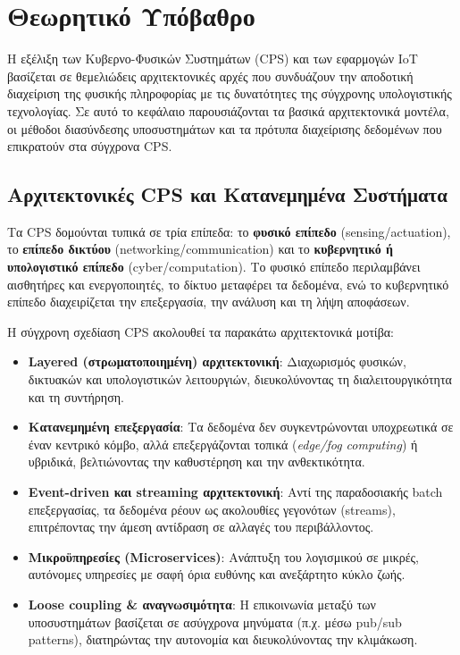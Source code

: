 \chapter{Θεωρητικό Υπόβαθρο}

Η εξέλιξη των Κυβερνο-Φυσικών Συστημάτων (CPS) και των εφαρμογών IoT βασίζεται σε θεμελιώδεις αρχιτεκτονικές αρχές που συνδυάζουν την αποδοτική διαχείριση της φυσικής πληροφορίας με τις δυνατότητες της σύγχρονης υπολογιστικής τεχνολογίας. Σε αυτό το κεφάλαιο παρουσιάζονται τα βασικά αρχιτεκτονικά μοντέλα, οι μέθοδοι διασύνδεσης υποσυστημάτων και τα πρότυπα διαχείρισης δεδομένων που επικρατούν στα σύγχρονα CPS.

\section{Αρχιτεκτονικές CPS και Κατανεμημένα Συστήματα}

Τα CPS δομούνται τυπικά σε τρία επίπεδα: το \textbf{φυσικό επίπεδο} (sensing/actuation), το \textbf{επίπεδο δικτύου} (networking/communication) και το \textbf{κυβερνητικό ή υπολογιστικό επίπεδο} (cyber/computation). Το φυσικό επίπεδο περιλαμβάνει αισθητήρες και ενεργοποιητές, το δίκτυο μεταφέρει τα δεδομένα, ενώ το κυβερνητικό επίπεδο διαχειρίζεται την επεξεργασία, την ανάλυση και τη λήψη αποφάσεων.

Η σύγχρονη σχεδίαση CPS ακολουθεί τα παρακάτω αρχιτεκτονικά μοτίβα:

\begin{itemize}
	\item \textbf{Layered (στρωματοποιημένη) αρχιτεκτονική}: Διαχωρισμός φυσικών, δικτυακών και υπολογιστικών λειτουργιών, διευκολύνοντας τη διαλειτουργικότητα και τη συντήρηση.
	\item \textbf{Κατανεμημένη επεξεργασία}: Τα δεδομένα δεν συγκεντρώνονται υποχρεωτικά σε έναν κεντρικό κόμβο, αλλά επεξεργάζονται τοπικά (\textit{edge/fog computing}) ή υβριδικά, βελτιώνοντας την καθυστέρηση και την ανθεκτικότητα.
	\item \textbf{Event-driven και streaming αρχιτεκτονική}: Αντί της παραδοσιακής batch επεξεργασίας, τα δεδομένα ρέουν ως ακολουθίες γεγονότων (streams), επιτρέποντας την άμεση αντίδραση σε αλλαγές του περιβάλλοντος.
	\item \textbf{Μικροϋπηρεσίες (Microservices)}: Ανάπτυξη του λογισμικού σε μικρές, αυτόνομες υπηρεσίες με σαφή όρια ευθύνης και ανεξάρτητο κύκλο ζωής.
	\item \textbf{Loose coupling \& αναγνωσιμότητα}: Η επικοινωνία μεταξύ των υποσυστημάτων βασίζεται σε ασύγχρονα μηνύματα (π.χ. μέσω pub/sub patterns), διατηρώντας την αυτονομία και διευκολύνοντας την κλιμάκωση.
\end{itemize}

